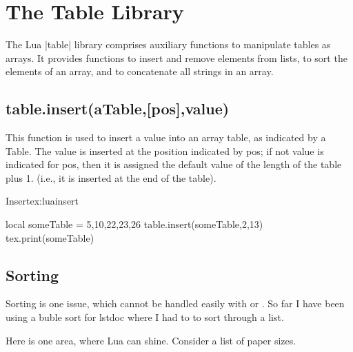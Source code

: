 \section{The Table Library}
The Lua |table| library comprises auxiliary functions to manipulate tables as arrays.
It provides functions to insert and remove elements from lists, to sort the elements of an array, and to concatenate all strings in an array.

\subsection{table.insert(aTable,[pos],value)}
This function is used to insert a value into an array table, as indicated by a Table. The value
is inserted at the position indicated by pos; if not value is indicated for pos, then it is assigned
the default value of the length of the table plus 1. (i.e., it is inserted at the end of the table).

\begin{texexample}{Insert}{ex:luainsert}
\begin{luacode}
   local someTable = {5,10,22,23,26}
   table.insert(someTable,2,13)
   tex.print(someTable)
\end{luacode}  

\end{texexample}



\subsection{Sorting}

Sorting is one issue, which cannot be handled easily with \latexe or . So far I have been using
a buble sort for lstdoc where I had to to sort through a list.

Here is one area, where Lua can shine. Consider a list of paper sizes.


